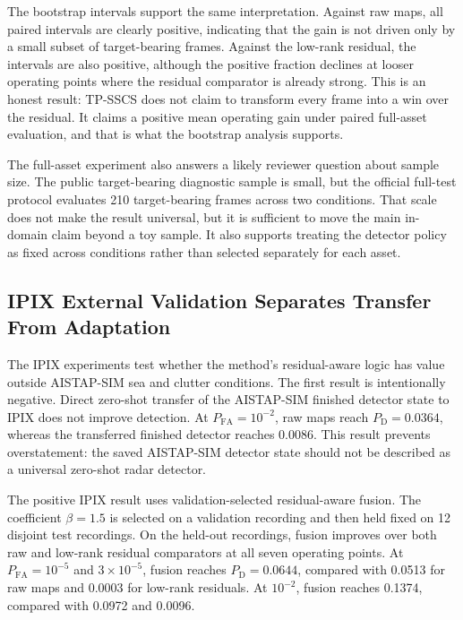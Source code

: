 \documentclass[journal]{IEEEtran}
\begin{document}
The bootstrap intervals support the same interpretation. Against raw maps, all paired intervals are clearly positive, indicating that the gain is not driven only by a small subset of target-bearing frames. Against the low-rank residual, the intervals are also positive, although the positive fraction declines at looser operating points where the residual comparator is already strong. This is an honest result: TP-SSCS does not claim to transform every frame into a win over the residual. It claims a positive mean operating gain under paired full-asset evaluation, and that is what the bootstrap analysis supports.

The full-asset experiment also answers a likely reviewer question about sample size. The public target-bearing diagnostic sample is small, but the official full-test protocol evaluates 210 target-bearing frames across two conditions. That scale does not make the result universal, but it is sufficient to move the main in-domain claim beyond a toy sample. It also supports treating the detector policy as fixed across conditions rather than selected separately for each asset.

\subsection{IPIX External Validation Separates Transfer From Adaptation}

The IPIX experiments test whether the method's residual-aware logic has value outside AISTAP-SIM sea and clutter conditions. The first result is intentionally negative. Direct zero-shot transfer of the AISTAP-SIM finished detector state to IPIX does not improve detection. At $P_{\mathrm{FA}}=10^{-2}$, raw maps reach $P_{\mathrm{D}}=0.0364$, whereas the transferred finished detector reaches 0.0086. This result prevents overstatement: the saved AISTAP-SIM detector state should not be described as a universal zero-shot radar detector.

The positive IPIX result uses validation-selected residual-aware fusion. The coefficient $\beta=1.5$ is selected on a validation recording and then held fixed on 12 disjoint test recordings. On the held-out recordings, fusion improves over both raw and low-rank residual comparators at all seven operating points. At $P_{\mathrm{FA}}=10^{-5}$ and $3 \times 10^{-5}$, fusion reaches $P_{\mathrm{D}}=0.0644$, compared with 0.0513 for raw maps and 0.0003 for low-rank residuals. At $10^{-2}$, fusion reaches 0.1374, compared with 0.0972 and 0.0096.
\end{document}
